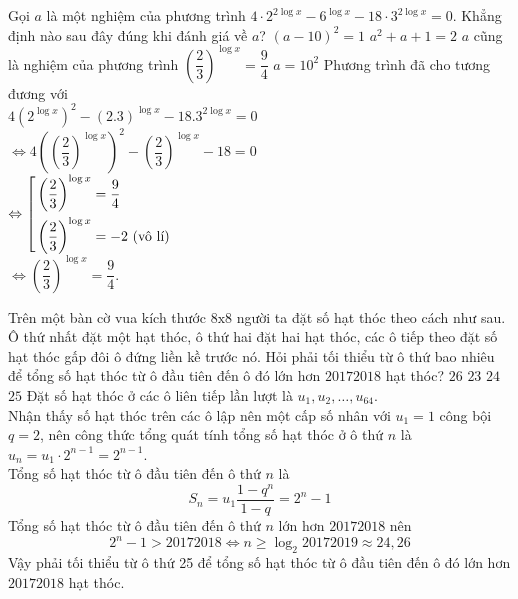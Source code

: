 \begin{ex}%
Gọi $a$ là một nghiệm của phương trình $4 \cdot 2^{2\log x} -6^{\log x} -18 \cdot 3^{2\log x}=0$. Khẳng định nào sau đây đúng khi đánh giá về $a$? 
\choice 
{$(a-10)^2 =1$}
{$a^2+a+1 =2$}
{\True $a$ cũng là nghiệm của phương trình $\left (\dfrac{2}{3}\right )^{\log x} =\dfrac{9}{4}$}
{$a=10^2$}
\loigiai
{
Phương trình đã cho tương đương với\\
\hspace*{0.6cm}$4\left (2^{\log x}\right )^2-(2.3)^{\log x}-18.3^{2\log x}=0$\\
$\Leftrightarrow  4\left (\left (\dfrac{2}{3}\right )^{\log x}\right )^2-\left (\dfrac{2}{3}\right )^{\log x}-18 =0$\\
$\Leftrightarrow  \left[\begin{aligned}&\left (\dfrac{2}{3}\right )^{\log x}=\dfrac{9}{4}\\
&\left (\dfrac{2}{3}\right )^{\log x}=-2 \text{ (vô lí)}\end{aligned}\right.$\\
$\Leftrightarrow \left (\dfrac{2}{3}\right )^{\log x}=\dfrac{9}{4}$.
}
\end{ex}

	
\begin{ex}%
Trên một bàn cờ vua kích thước $8\text{x}8$ người ta đặt số hạt thóc theo cách như sau. Ô thứ nhất đặt một hạt thóc, ô thứ hai đặt hai hạt thóc, các ô tiếp theo đặt số hạt thóc gấp đôi ô đứng liền kề trước nó. Hỏi phải tối thiểu từ ô thứ bao nhiêu để tổng số hạt thóc từ ô đầu tiên đến ô đó lớn hơn $20172018$ hạt thóc? 
\choice 
{$26$}
{$23$}
{$24$}
{\True $25$}
\loigiai
{
Đặt số hạt thóc ở các ô liên tiếp lần lượt  là $u_1, u_2,\ldots, u_{64}$.\\
Nhận thấy số hạt thóc trên các ô lập nên một cấp số nhân với $u_1=1$ công bội $q=2$, nên công thức tổng quát tính tổng số hạt thóc ở ô thứ $n$ là $u_n=u_1\cdot 2^{n-1}=2^{n-1}$.\\
Tổng số hạt thóc từ ô đầu tiên đến ô thứ $n$ là $$S_n=u_1\dfrac{1-q^n}{1-q} =2^n-1$$
Tổng số hạt thóc từ ô đầu tiên đến ô thứ $n$ lớn hơn $20172018$ nên
$$2^n-1>20172018\Leftrightarrow n\ge \log_2{20172019}  \approx 24{,}26 $$
Vậy phải tối thiểu từ ô thứ 25 để tổng số hạt thóc từ ô đầu tiên đến ô đó lớn hơn $20172018$ hạt thóc.
}
\end{ex}



